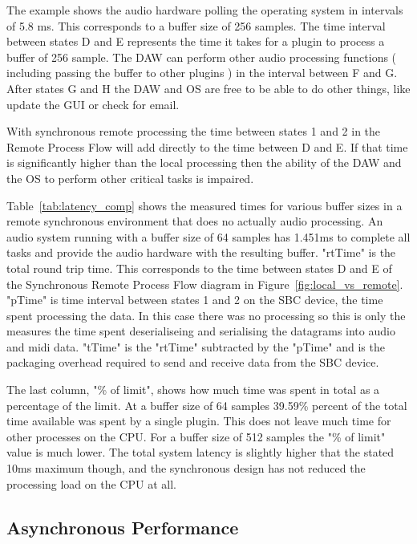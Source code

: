 The example shows the audio hardware polling the operating system in intervals of 5.8 ms. This corresponds to a buffer size of 256 samples. The time interval between states D and E represents the time it takes for a plugin to process a buffer of 256 sample. The DAW can perform other audio processing functions ( including passing the buffer to other plugins ) in the interval between F and G. After states G and H the DAW and OS are free to be able to do other things, like update the GUI or check for email.

With synchronous remote processing the time between states 1 and 2 in the Remote Process Flow will add directly to the time between D and E. If that time is significantly higher than the local processing then the ability of the DAW and the OS to perform other critical tasks is impaired.



Table~\ref{tab:latency_comp} shows the measured times for various buffer sizes in a remote synchronous environment that does no actually audio processing. An audio system running with a buffer size of 64 samples has 1.451ms to complete all tasks and provide the audio hardware with the resulting buffer. "rtTime" is the total round trip time. This corresponds to the time between states D and E of the Synchronous Remote Process Flow diagram in Figure~\ref{fig:local_vs_remote}. "pTime" is time interval between states 1 and 2 on the SBC device, the time spent processing the data. In this case there was no processing so this is only the measures the time spent deserialiseing and serialising the datagrams into audio and midi data. "tTime" is the "rtTime" subtracted by the "pTime" and is the packaging overhead required to send and receive data from the SBC device.

The last column, "\% of limit", shows how much time was spent in total as a percentage of the limit. At a buffer size of 64 samples 39.59\% percent of the total time available was spent by a single plugin. This does not leave much time for other processes on the CPU. For a buffer size of 512 samples the "\% of limit" value is much lower. The total system latency is slightly higher that the stated 10ms maximum though, and the synchronous design has not reduced the processing load on the CPU at all.


\subsection{Asynchronous Performance}

